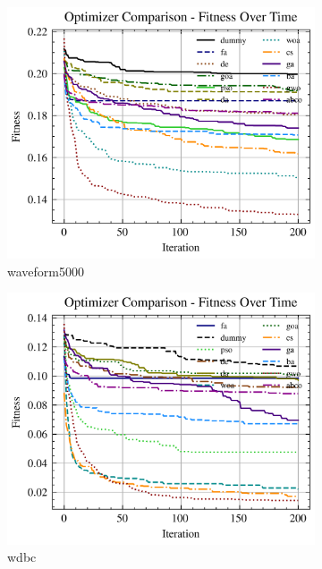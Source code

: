 \begin{figure}[htp]
    \begin{subfigure}[htp]{0.45\textwidth}
        \includegraphics[width=\textwidth]{imagenes/fitness_charts/img/real/waveform5000/optimizers_fitness_svc.png}
        \caption{waveform5000}
    \end{subfigure}
    \begin{subfigure}[htp]{0.45\textwidth}
        \includegraphics[width=\textwidth]{imagenes/fitness_charts/img/real/wdbc/optimizers_fitness_svc.png}
        \caption{wdbc}
    \end{subfigure}
    \begin{subfigure}[htp]{0.45\textwidth}

\end{subfigure}
\end{figure}
